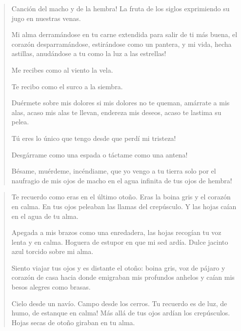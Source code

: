 \documentclass[12pt]{article}
\begin{document}
\clearpage
{}
\begin{verse}
Canción del macho y de la hembra!  
La fruta de los siglos  
exprimiendo su jugo  
en nuestras venas.  
  
Mi alma derramándose en tu carne extendida  
para salir de ti más buena,  
el corazón desparramándose,  
estirándose como un pantera,  
y mi vida, hecha astillas, anudándose  
a tu como la luz a las estrellas!  
  
Me recibes  
como al viento la vela.  
  
Te recibo  
como el surco a la siembra.  
  
Duérmete sobre mis dolores  
si mis dolores no te queman,  
amárrate a mis alas,  
acaso mis alas te llevan,  
endereza mis deseos,  
acaso te lastima su pelea.  
  
Tú eres lo único que tengo  
desde que perdí mi tristeza!  
  
Desgárrame como una espada  
o táctame como una antena!  
  
Bésame,  
muérdeme,  
incéndiame,  
que yo vengo a tu tierra  
solo por el naufragio de mis ojos de macho  
en el agua infinita de tus ojos de hembra!

\end{verse}

\clearpage
{}
\begin{verse}
Te recuerdo como eras en el último otoño.  
Eras la boina gris y el corazón en calma.  
En tus ojos peleaban las llamas del crepúsculo.  
Y las hojas caían en el agua de tu alma.  
  
Apegada a mis brazos como una enredadera,  
las hojas recogían tu voz lenta y en calma.  
Hoguera de estupor en que mi sed ardía.  
Dulce jacinto azul torcido sobre mi alma.  
  
Siento viajar tus ojos y es distante el otoño:  
boina gris, voz de pájaro y corazón de casa  
hacia donde emigraban mis profundos anhelos  
y caían mis besos alegres como brasas.  
  
Cielo desde un navío. Campo desde los cerros.  
Tu recuerdo es de luz, de humo, de estanque en calma!  
Más allá de tus ojos ardían los crepúsculos.  
Hojas secas de otoño giraban en tu alma.

\end{verse}
\end{document}
